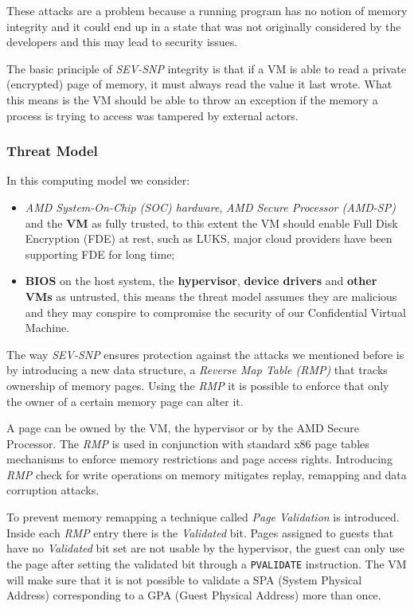 \documentclass[twocolumn]{article}
\begin{document}
These attacks are a problem because a running program has no notion of memory integrity and it could end up in a state that was not originally considered by the developers and this may lead to security issues.

The basic principle of \textit{SEV-SNP} integrity is that if a VM is able to read a private (encrypted) page of memory, it must always read the value it last wrote. What this means is the VM should be able to throw an exception if the memory a process is trying to access was tampered by external actors.

\subsubsection{Threat Model}
In this computing model we consider:
\begin{itemize}
    \item \textit{AMD System-On-Chip (SOC) hardware}, \textit{AMD Secure Processor (AMD-SP)} and the \textbf{VM} as fully trusted, to this extent the VM should enable Full Disk Encryption (FDE) at rest, such as LUKS, major cloud providers have been supporting FDE for long time;
    \item \textbf{BIOS} on the host system, the \textbf{hypervisor}, \textbf{device drivers} and \textbf{other VMs} as untrusted, this means the threat model assumes they are malicious and they may conspire to compromise the security of our Confidential Virtual Machine.
\end{itemize}

The way \textit{SEV-SNP} ensures protection against the attacks we mentioned before is by introducing a new data structure, a \textit{Reverse Map Table (RMP)} that tracks ownership of memory pages. Using the \textit{RMP} it is possible to enforce that only the owner of a certain memory page can alter it.

A page can be owned by the VM, the hypervisor or by the AMD Secure Processor. The \textit{RMP} is used in conjunction with standard x86 page tables mechanisms to enforce memory restrictions and page access rights. Introducing \textit{RMP} check for write operations on memory mitigates replay, remapping and data corruption attacks. 

To prevent memory remapping a technique called \textit{Page Validation} is introduced. Inside each \textit{RMP} entry there is the \textit{Validated} bit. Pages assigned to guests that have no \textit{Validated} bit set are not usable by the hypervisor, the guest can only use the page after setting the validated bit through a \texttt{PVALIDATE} instruction. The VM will make sure that it is not possible to validate a SPA (System Physical Address) corresponding to a GPA (Guest Physical Address) more than once.
 
\end{document}
